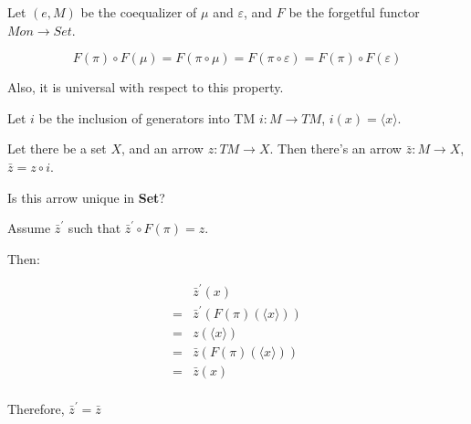 \documentclass{article}
\begin{document}
\begin{enumerate}
        Let $(e,M)$ be the coequalizer of $μ$ and $ε$, and $F$ be the
        forgetful functor $Mon → Set$.

        $$F(\pi)\circ F(μ) = F(\pi \circ μ) = F(\pi \circ ε) = F(\pi) \circ F(ε)$$

        Also, it is universal with respect to this property.

        Let $i$ be the inclusion of generators into TM $i : M → TM$,
        $i(x) = \langle x \rangle$.
        
        Let there be a set $X$, and an arrow $z : TM → X$. Then there's
        an arrow $\bar{z} : M → X$, $\bar{z} = z \circ i$.

        Is this arrow unique in {\bf Set}?

        Assume $\bar{z}^\prime$ such that $\bar{z}^\prime \circ F(\pi) = z$.

        Then:

        \begin{align*}
          & \bar{z}^\prime(x) \\
        = & \bar{z}^\prime(F(\pi)(\langle x \rangle))  \\
        = & z(\langle x \rangle)                                  \\
        = & \bar{z}(F(\pi)(\langle x \rangle))                         \\
        = & \bar{z}(x) \\
        \end{align*}
 
        Therefore, $\bar{z}^\prime = \bar{z}$
\end{enumerate} 
\end{document}
